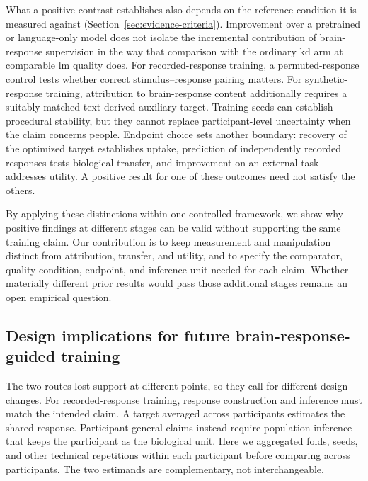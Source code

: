 What a positive contrast establishes also depends on the reference condition it is measured against (Section~\ref{sec:evidence-criteria}).
Improvement over a pretrained or language-only model does not isolate the incremental contribution of brain-response supervision in the way that comparison with the ordinary \ac{kd} arm at comparable \ac{lm} quality does.
For recorded-response training, a permuted-response control tests whether correct stimulus--response pairing matters.
For synthetic-response training, attribution to brain-response content additionally requires a suitably matched text-derived auxiliary target.
Training seeds can establish procedural stability, but they cannot replace participant-level uncertainty when the claim concerns people.
Endpoint choice sets another boundary: recovery of the optimized target establishes uptake, prediction of independently recorded responses tests biological transfer, and improvement on an external task addresses utility.
A positive result for one of these outcomes need not satisfy the others.

By applying these distinctions within one controlled framework, we show why positive findings at different stages can be valid without supporting the same training claim.
Our contribution is to keep measurement and manipulation distinct from attribution, transfer, and utility, and to specify the comparator, quality condition, endpoint, and inference unit needed for each claim.
Whether materially different prior results would pass those additional stages remains an open empirical question.

\subsection{Design implications for future brain-response-guided training}
\label{sec:discussion-design}

The two routes lost support at different points, so they call for different design changes.
For recorded-response training, response construction and inference must match the intended claim.
A target averaged across participants estimates the shared response.
Participant-general claims instead require population inference that keeps the participant as the biological unit.
Here we aggregated folds, seeds, and other technical repetitions within each participant before comparing across participants.
The two estimands are complementary, not interchangeable.

